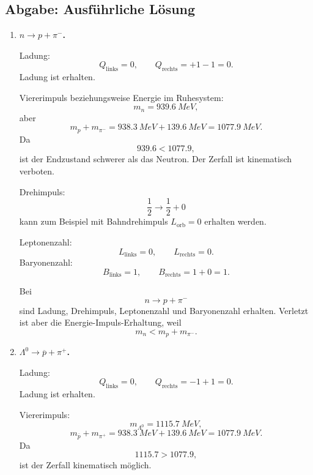 \documentclass[11pt,a4paper]{scrartcl}
\theoremstyle{definition}
\theoremstyle{plain}
\theoremstyle{remark}
\begin{document}
\subsection{Abgabe: Ausf\"uhrliche L\"osung}

\begin{enumerate}[label=(\alph*)]
    \item \textbf{$n\to p+\pi^-$.}

    \begin{calculationbox}
        Ladung:
        \[
            Q_{\mathrm{links}}=0,
            \qquad
            Q_{\mathrm{rechts}}=+1-1=0.
        \]
        Ladung ist erhalten.

        Viererimpuls beziehungsweise Energie im Ruhesystem:
        \[
            m_n=\SI{939.6}{MeV},
        \]
        aber
        \[
            m_p+m_{\pi^-}
            =
            \SI{938.3}{MeV}+\SI{139.6}{MeV}
            =
            \SI{1077.9}{MeV}.
        \]
        Da
        \[
            939.6<1077.9,
        \]
        ist der Endzustand schwerer als das Neutron. Der Zerfall ist kinematisch verboten.

        Drehimpuls:
        \[
            \frac12 \to \frac12+0
        \]
        kann zum Beispiel mit Bahndrehimpuls $L_{\mathrm{orb}}=0$ erhalten werden.

        Leptonenzahl:
        \[
            L_{\mathrm{links}}=0,
            \qquad
            L_{\mathrm{rechts}}=0.
        \]
        Baryonenzahl:
        \[
            B_{\mathrm{links}}=1,
            \qquad
            B_{\mathrm{rechts}}=1+0=1.
        \]
    \end{calculationbox}

    \begin{answerbox}
        Bei
        \[
            n\to p+\pi^-
        \]
        sind Ladung, Drehimpuls, Leptonenzahl und Baryonenzahl erhalten. Verletzt ist aber die Energie-Impuls-Erhaltung, weil
        \[
            \boxed{m_n<m_p+m_{\pi^-}}.
        \]
    \end{answerbox}

    \item \textbf{$\Lambda^0\to\overline p+\pi^+$.}

    \begin{calculationbox}
        Ladung:
        \[
            Q_{\mathrm{links}}=0,
            \qquad
            Q_{\mathrm{rechts}}=-1+1=0.
        \]
        Ladung ist erhalten.

        Viererimpuls:
        \[
            m_{\Lambda^0}=\SI{1115.7}{MeV},
        \]
        \[
            m_{\overline p}+m_{\pi^+}
            =
            \SI{938.3}{MeV}+\SI{139.6}{MeV}
            =
            \SI{1077.9}{MeV}.
        \]
        Da
        \[
            1115.7>1077.9,
        \]
        ist der Zerfall kinematisch möglich.


\end{calculationbox}
\end{enumerate}
\end{document}
